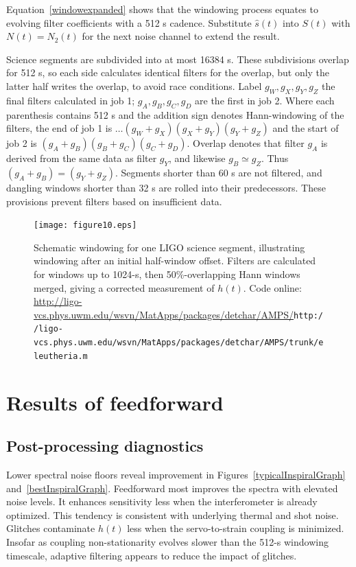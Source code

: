 	Equation~\ref{windowexpanded} shows that the windowing process equates to evolving filter coefficients with a 512 s cadence. Substitute $\hat{s}(t)$ into $S(t)$ with $N(t) = N_2(t)$ for the next noise channel to extend the result.

            Science segments are subdivided into at most 16384 s. These subdivisions overlap for 512 s, so each side calculates identical filters for the overlap, but only the latter half writes the overlap, to avoid race conditions. Label $g_W, g_X, g_Y, g_Z$ the final filters calculated in job 1; $g_A, g_B, g_C, g_D$ are the first in job 2. Where each parenthesis contains 512 s and the addition sign denotes Hann-windowing of the filters, the end of job 1 is $\ldots(g_W+g_X)(g_X+g_Y)(g_Y+g_Z)$ and the start of job 2 is $(g_A+g_B)(g_B+g_C)(g_C+g_D)$. Overlap denotes that filter $g_A$ is derived from the same data as filter $g_Y$, and likewise $g_B \simeq g_Z$. Thus $(g_A+g_B)=(g_Y+g_Z)$. Segments shorter than 60 s are not filtered, and dangling windows shorter than 32 s are rolled into their predecessors. These provisions prevent filters based on insufficient data. 

\begin{figure}
\begin{center}
\texttt{[image: figure10.eps]}
\caption{Schematic windowing for one LIGO science segment, illustrating windowing after an initial half-window offset. Filters are calculated for windows up to 1024-s, then 50\%-overlapping Hann windows merged, giving a corrected measurement of $h(t)$. Code online: \url{http://ligo-vcs.phys.uwm.edu/wsvn/MatApps/packages/detchar/AMPS/}{\texttt{http://ligo-vcs.phys.uwm.edu/wsvn/MatApps/packages/detchar/AMPS/}}\newline \texttt{trunk/eleutheria.m}}
\label{windowingScience}
\end{center}
\end{figure}

    \section{Results of feedforward}
    \label{all-results}

        \subsection{Post-processing diagnostics}
        \label{diagnostics}
 

Lower spectral noise floors reveal improvement in Figures~\ref{typicalInspiralGraph} and~\ref{bestInspiralGraph}. Feedforward most improves the spectra with elevated noise levels. It enhances sensitivity less when the interferometer is already optimized. This tendency is consistent with underlying thermal and shot noise. Glitches contaminate $h(t)$ less when the servo-to-strain coupling is minimized. Insofar as coupling non-stationarity evolves slower than the 512-s windowing timescale, adaptive filtering appears to reduce the impact of glitches.

